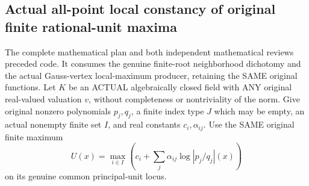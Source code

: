 \subsection{Actual all-point local constancy of original finite rational-unit maxima}

The complete mathematical plan and both independent mathematical reviews preceded code. It consumes the genuine
finite-root neighborhood dichotomy and the actual Gauss-vertex local-maximum
producer, retaining the SAME original functions. Let $K$ be an ACTUAL
algebraically closed field with ANY original real-valued valuation $v$,
without completeness or nontriviality of the norm. Give original nonzero
polynomials $p_j,q_j$, a finite index type $J$ which may be empty, an
actual nonempty finite set $I$, and real constants $c_i,\alpha_{ij}$.
Use the SAME original finite maximum
\[
 U(x)=\max_{i\in I}\left(c_i+
                \sum_j\alpha_{ij}\log|p_j/q_j|(x)\right)
\]
on its genuine common principal-unit locus.

